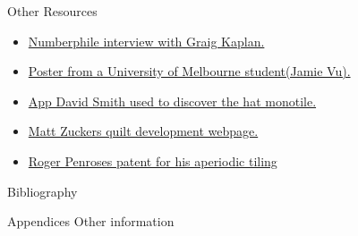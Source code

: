 \documentclass{beamer}
\begin{document}
\begin{frame}[allowframebreaks]{Other Resources}
    \begin{itemize}
        \item \href{https://www.youtube.com/watch?v=_ZS3Oqg1AX0&ab_channel=Numberphile}{Numberphile interview with Graig Kaplan.}
        \item \href{https://ms.unimelb.edu.au/__data/assets/pdf_file/0011/5218382/vujamie_296128_22162633_Jamie_Vu_Poster_final.pdf}{Poster from a University of Melbourne student(Jamie Vu).}
        \item \href{https://cs.uwaterloo.ca/~csk/spectre/app.html}{App David Smith used to discover the hat monotile.}
        \item \href{https://mzucker.github.io/2022/11/13/penrose-tiling-quilt.html}{Matt Zuckers quilt development webpage.}
        \item \href{https://patentimages.storage.googleapis.com/f2/9b/08/1b79cb4e4c0f3f/US4133152.pdf}{Roger Penroses patent for his aperiodic tiling}
    \end{itemize}
\end{frame}

    

\begin{frame}[allowframebreaks]{Bibliography}
  \footnotesize
  
  
\end{frame}



\begin{frame}{Appendices}
    Other information
\end{frame}

% 
\end{document}
